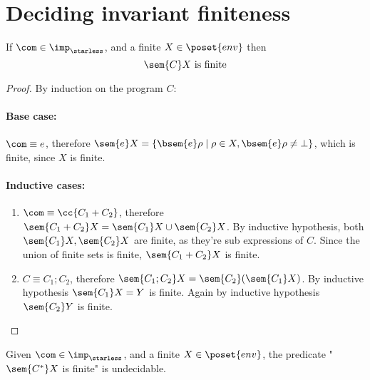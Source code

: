 \section{Deciding invariant finiteness}

\begin{lemma}\label{le:finiteness}
  If \(\com\in\imp_\starless\), and a finite \(X \in \poset{env}\)
  then \[\sem{C}X \text{ is finite}\]
\end{lemma}

\begin{proof}
  By induction on the program \(C\):
  \paragraph*{Base case:\\}
  \(\com \equiv e\), therefore \(\sem{e}X = \{\bsem{e}\rho \mid \rho
  \in X , \bsem{e}\rho \neq \bot\}\), which is finite, since \(X\) is
  finite.
  
  \paragraph*{Inductive cases:\\}
  \begin{enumerate}
  \item \(\com\equiv \cc{C_1 + C_2}\), therefore \(\sem{C_1 + C_2} X =
    \sem{C_1}X \cup \sem{C_2}X\). By inductive hypothesis, both
    \(\sem{C_1}X, \sem{C_2}X\) are finite, as they're sub expressions
    of \(C\). Since the union of finite sets is finite, \(\sem{C_1 +
      C_2}X\) is finite.
  \item \(C\equiv C_1; C_2\), therefore \(\sem{C_1;C_2}X =
    \sem{C_2}(\sem{C_1}X)\). By inductive hypothesis \(\sem{C_1}X =
    Y\) is finite. Again by inductive hypothesis \(\sem{C_2}Y\) is
    finite.
  \end{enumerate}
\end{proof}

\begin{lemma}\label{le:infiniteness}
  Given \(\com\in\imp_\starless\), and a finite \(X \in \poset{env}\),
  the predicate "\(\sem{C^*}X\) is finite" is undecidable.
\end{lemma}


